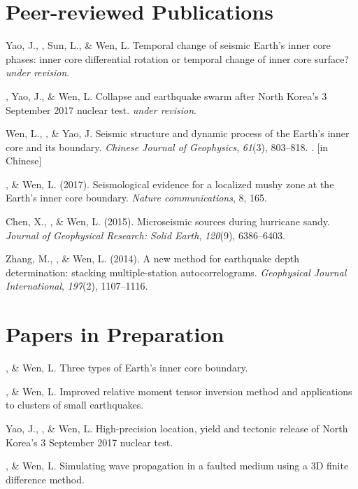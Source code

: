 \section*{Peer-reviewed Publications}
\begin{etaremune}
\item
    Yao, J., \Tian, Sun, L., \& Wen, L.
    Temporal change of seismic Earth's inner core phases: inner core differential rotation or temporal change of inner core surface?
    \textit{under revision}.
\item
    \Tian, Yao, J., \& Wen, L.
    Collapse and earthquake swarm after North Korea's 3 September 2017 nuclear test.
    \textit{under revision}.
\item
    Wen, L., \Tian, \& Yao, J.
    Seismic structure and dynamic process of the Earth's inner core and its boundary.
    \textit{Chinese Journal of Geophysics}, \textit{61}(3), 803--818.
    . [in Chinese]
\item
    \Tian, \& Wen, L. (2017).
    Seismological evidence for a localized mushy zone at the Earth's inner core boundary.
    \textit{Nature communications}, 8, 165.
\item
    Chen, X., \Tian, \& Wen, L. (2015).
    Microseismic sources during hurricane sandy.
    \textit{Journal of Geophysical Research: Solid Earth}, \textit{120}(9), 6386--6403.
\item Zhang, M., \Tian, \& Wen, L. (2014).
    A new method for earthquake depth determination: stacking multiple-station autocorrelograms.
    \textit{Geophysical Journal International}, \textit{197}(2), 1107--1116.\\
\end{etaremune}

\section*{Papers in Preparation}
\begin{etaremune}
\item
    \Tian, \& Wen, L.
    Three types of Earth's inner core boundary.
\item
    \Tian, \& Wen, L.
    Improved relative moment tensor inversion method and applications to clusters of small earthquakes.
\item
    Yao, J., \Tian, \& Wen, L.
    High-precision location, yield and tectonic release of North Korea's 3 September 2017 nuclear test.
\item
    \Tian, \& Wen, L.
    Simulating wave propagation in a faulted medium using a 3D finite difference method.
\end{etaremune}
